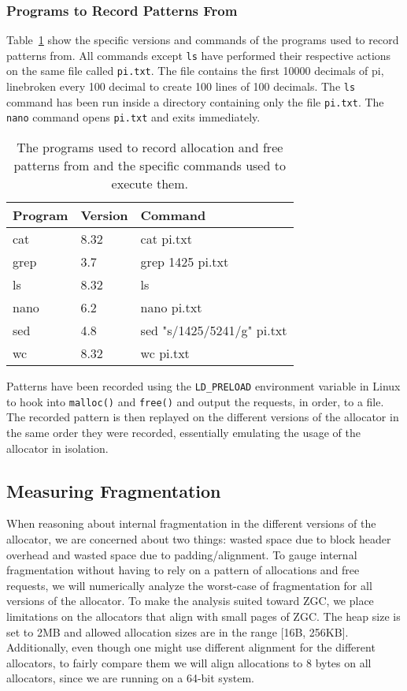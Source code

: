 \subsubsection{Programs to Record Patterns From}

Table~\ref{table:pattern-programs} show the specific versions and commands of the programs used to record patterns from. All commands except \texttt{ls} have performed their respective actions on the same file called \texttt{pi.txt}. The file contains the first 10000 decimals of pi, linebroken every 100 decimal to create 100 lines of 100 decimals. The \texttt{ls} command has been run inside a directory containing only the file \texttt{pi.txt}. The \texttt{nano} command opens \texttt{pi.txt} and exits immediately.

\begin{table}[H]
\centering
\begin{tabular}{llp{10.4cm}}
\textbf{Program} & \textbf{Version} & \textbf{Command} \\ \hline
cat  & 8.32 & cat pi.txt\\ \hline
grep & 3.7  & grep 1425 pi.txt\\ \hline
ls   & 8.32 & ls \\ \hline
nano & 6.2  & nano pi.txt\\ \hline
sed  & 4.8  & sed "s/1425/5241/g" pi.txt\\ \hline
wc   & 8.32 & wc pi.txt\\ \hline
\end{tabular}
\caption{The programs used to record allocation and free patterns from and the specific commands used to execute them.}
\label{table:pattern-programs}
\end{table}

Patterns have been recorded using the \texttt{LD\_PRELOAD} environment variable in Linux to hook into \texttt{malloc()} and \texttt{free()} and output the requests, in order, to a file. The recorded pattern is then replayed on the different versions of the allocator in the same order they were recorded, essentially emulating the usage of the allocator in isolation.

\subsection{Measuring Fragmentation}

When reasoning about internal fragmentation in the different versions of the allocator, we are concerned about two things: wasted space due to block header overhead and wasted space due to padding/alignment. To gauge internal fragmentation without having to rely on a pattern of allocations and free requests, we will numerically analyze the worst-case of fragmentation for all versions of the allocator. To make the analysis suited toward ZGC, we place limitations on the allocators that align with small pages of ZGC. The heap size is set to 2MB and allowed allocation sizes are in the range [16B, 256KB]. Additionally, even though one might use different alignment for the different allocators, to fairly compare them we will align allocations to 8 bytes on all allocators, since we are running on a 64-bit system.

